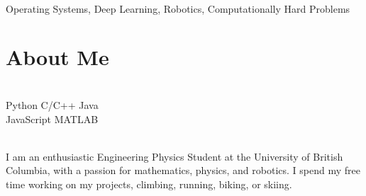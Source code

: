 \documentclass[]{deedy-resume-openfont}
\begin{document}
\begin{adjustwidth}{0.55cm}{1.25cm}
     \\
     Operating Systems, Deep Learning, Robotics, Computationally Hard Problems
\end{adjustwidth}

\vspace{10pt}

\section{About Me}
\begin{minipage}[t]{.35\textwidth}
     \\
    Python \textbullet{} C/C++ \textbullet{} Java \\
    JavaScript \textbullet{} MATLAB
    \vspace{8pt}
\end{minipage}
\hfill
\begin{minipage}[t]{.55\textwidth}
     \\
    I am an enthusiastic Engineering Physics Student at the University of British Columbia, with a passion for mathematics, physics, and robotics. I spend my free time working on my projects, climbing, running, biking, or skiing.
\end{minipage}
\end{document}
